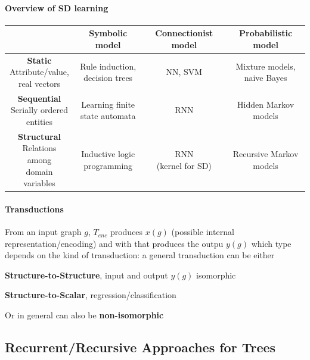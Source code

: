 \documentclass[10pt]{report}
\begin{document}
\paragraph{Overview of SD learning}
\begin{center}
\begin{tabular}{c | c | c | c}
& \textbf{Symbolic model} & \textbf{Connectionist model} & \textbf{Probabilistic model}\\
\hline
\makecell{\textbf{Static}\\Attribute/value,\\real vectors} & \makecell{Rule induction,\\decision trees} & NN, SVM & \makecell{Mixture models,\\naive Bayes}\\
\hline
\makecell{\textbf{Sequential}\\Serially ordered\\entities} & \makecell{Learning finite\\state automata} & RNN & \makecell{Hidden Markov\\models}\\
\hline
\makecell{\textbf{Structural}\\Relations among\\domain variables} & \makecell{Inductive logic\\programming} & \makecell{RNN\\(kernel for SD)} & \makecell{Recursive Markov\\models}
\end{tabular}
\end{center}
\paragraph{Transductions}
From an input graph $g$, $T_{enc}$ produces $x(g)$ (possible internal representation/encoding) and with that produces the outpu $y(g)$ which type depends on the kind of transduction: a general transduction can be either
\begin{list}{}{}
	\item \textbf{Structure-to-Structure}, input and output $y(g)$ isomorphic
	\item \textbf{Structure-to-Scalar}, regression/classification
	\item Or in general can also be \textbf{non-isomorphic}
\end{list}
\subsection{Recurrent/Recursive Approaches for Trees}
\end{document}
